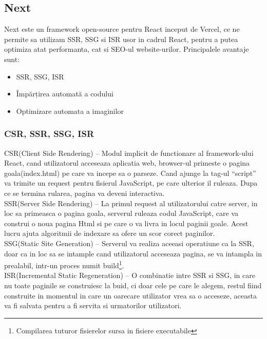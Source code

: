 \documentclass[12pt, a4paper, oneside, romanian]{teza-upb}
\begin{document}
\subsection{Next}

Next este un framework open-source pentru React inceput de Vercel, ce ne permite sa utilizam SSR, SSG si ISR usor in cadrul React, pentru a putea optimiza atat performanta, cat si SEO-ul website-urilor. Principalele avantaje sunt:

\begin{itemize}
	\item SSR, SSG, ISR
	\item Împărțirea automată a codului
	\item Optimizare automata a imaginilor
\end{itemize}

\subsubsection{CSR, SSR, SSG, ISR}

CSR(Client Side Rendering) -- Modul implicit de functionare al framework-ului React, cand utilizatorul acceseaza aplicatia web, browser-ul primeste o pagina goala(index.html) pe care va incepe sa o parseze. Cand ajunge la tag-ul ``script'' va trimite un request pentru fisierul JavaScript, pe care ulterior il ruleaza. Dupa ce se termina rularea, pagina va deveni interactiva.\\

SSR(Server Side Rendering) -- La primul request al utilizatorului catre server, in loc sa primeasca o pagina goala, serverul ruleaza codul JavaScript, care va construi o noua pagina Html si pe care o va livra in locul paginii goale. Acest lucru ajuta algoritmii de indexare sa ofere un scor corect paginilor.\\

SSG(Static Site Generation) -- Serverul va realiza aceeasi operatiune ca la SSR, doar ca in loc sa se intample cand utilizatorul acceseaza pagina, se va intampla in prealabil, intr-un proces numit build\footnote{Compilarea tuturor fisierelor sursa in fisiere executabile}.\\

ISR(Incremental Static Regeneration) -- O combinatie intre SSR si SSG, in care nu toate paginile se construiesc la buid, ci doar cele pe care le alegem, restul fiind construite in momentul in care un oarecare utilizator vrea sa o acceseze, aceasta va fi salvata pentru a fi servita si urmatorilor utilizatori.
\end{document}
